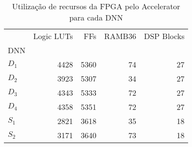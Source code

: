 \begin{table}[ht!]
\centering
\caption{Utilização de recursos da FPGA pelo Accelerator para cada DNN}
\label{tab:5-vivado-accelerator}
\begin{tabular}{lrrrr}
\toprule
 & Logic LUTs & FFs & RAMB36 & DSP Blocks \\
DNN &  &  &  &  \\
\midrule
$D_1$ &       4428 & 5360 &     74 &         27 \\
$D_2$ &       3923 & 5307 &     34 &         27 \\
$D_3$ &       4343 & 5333 &     72 &         27 \\
$D_4$ &       4358 & 5351 &     72 &         27 \\
$S_1$ &       2821 & 3618 &     35 &         18 \\
$S_2$ &       3171 & 3640 &     73 &         18 \\
\bottomrule
\end{tabular}
\end{table}
